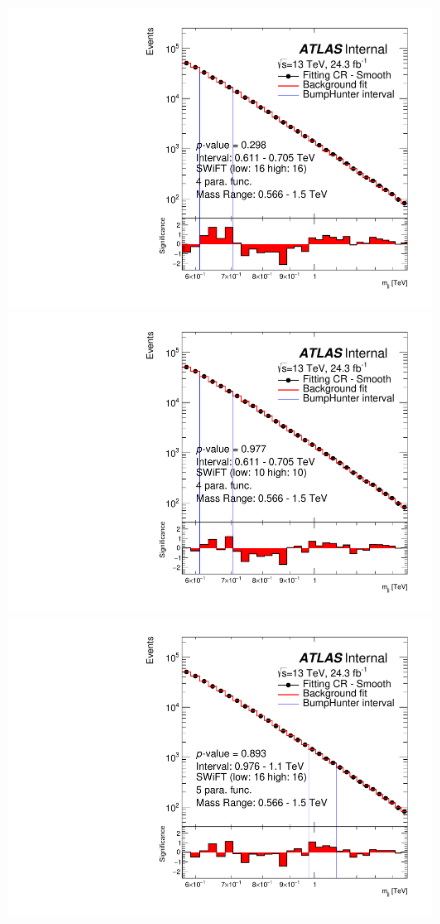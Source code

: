 \begin{figure}[!htb]
\captionsetup[subfigure]{aboveskip=0pt,justification=centering}
\centering
{} {
  \includegraphics[width=0.45\linewidth, angle=0]{figs/Dibjet/LowMass/FitStudy_min566/bhFit_corrFitCR_smooth_4para_low16_high16.pdf}
}
 {
  \includegraphics[width=0.45\linewidth, angle=0]{figs/Dibjet/LowMass/FitStudy_min566/bhFit_corrFitCR_smooth_4para_low10_high10.pdf}
}
 {
  \includegraphics[width=0.45\linewidth, angle=0]{figs/Dibjet/LowMass/FitStudy_min566/bhFit_corrFitCR_smooth_5para_low16_high16.pdf}
}

\end{figure}
